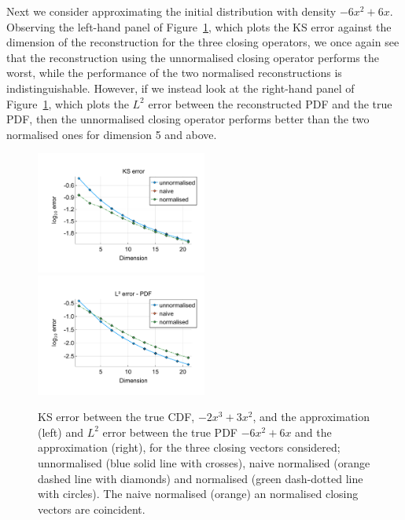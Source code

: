 \begin{example}Next we consider approximating the initial distribution with density \(-6x^2+6x\). Observing the left-hand panel of Figure~\ref{fig: fun 6 ks error qbdrap closing vecs}, which plots the KS error against the dimension of the reconstruction for the three closing operators, we once again see that the reconstruction using the unnormalised closing operator performs the worst, while the performance of the two normalised reconstructions is indistinguishable. However, if we instead look at the right-hand panel of Figure~\ref{fig: fun 6 ks error qbdrap closing vecs}, which plots the \(L^2\) error between the reconstructed PDF and the true PDF, then the unnormalised closing operator performs better than the two normalised ones for dimension 5 and above. 
\begin{figure}[h]
	\centering
	\includegraphics[width=0.5\textwidth,trim={1.25cm 0.8cm 0.25cm 1.25cm},clip]{chapter6/figs/qbdrap_closing_vec/fun6/ks_error_formatted.pdf}%
	\includegraphics[width=0.5\textwidth,trim={1.25cm 0.8cm 0.25cm 1.25cm},clip]{chapter6/figs/qbdrap_closing_vec/fun6/l2_pdf_error_formatted.pdf}
	\caption{KS error between the true CDF, \(-2x^3+3x^2\), and the approximation (left) and \(L^2\) error between the true PDF \(-6x^2+6x\) and the approximation (right), for the three closing vectors considered; unnormalised (blue solid line with crosses), naive normalised (orange dashed line with diamonds) and normalised (green dash-dotted line with circles). The naive normalised (orange) an normalised closing vectors are coincident.}
	\label{fig: fun 6 ks error qbdrap closing vecs}
\end{figure}


\end{example}
